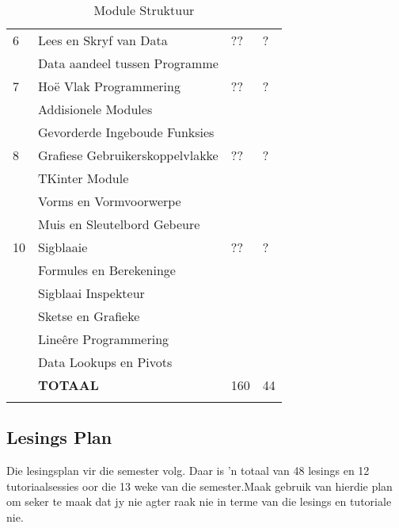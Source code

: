 \begin{longtable}{|p{2.0cm}|p{7.6cm}|p{2.0cm}|p{1.8cm}|}
             \hline
             6  & Lees en Skryf van Data                       & ?? & ?  \\
                & \qquad Data aandeel tussen Programme         &    &    \\
             \hline
             7  & Ho\"{e} Vlak Programmering                   & ?? & ?  \\
                & \qquad Addisionele Modules                   &    &    \\
                & \qquad Gevorderde Ingeboude Funksies         &    &    \\
             \hline
             8  & Grafiese Gebruikerskoppelvlakke              & ?? & ?  \\
                & \qquad TKinter Module                        &    &    \\
                & \qquad Vorms en Vormvoorwerpe                &    &    \\
                & \qquad Muis en Sleutelbord Gebeure           &    &    \\
             \hline
             10 & Sigblaaie                                    & ?? & ?  \\
                & \qquad Formules en Berekeninge               &    &    \\
                & \qquad Sigblaai Inspekteur                   &    &    \\
                & \qquad Sketse en Grafieke                    &    &    \\
                & \qquad Line\^{e}re Programmering             &    &    \\
                & \qquad Data Lookups en Pivots                &    &    \\
             \hline
                & {\bf TOTAAL}                                 &160 & 44 \\
             \hline
            \caption[Module Struktuur]{Module Struktuur} \label{tab:study_comp}
        \end{longtable}

    \subsection{Lesings Plan}
        Die lesingsplan vir die semester volg. Daar is 'n totaal van 48
        lesings en 12 tutoriaalsessies oor die 13 weke van die semester.Maak
        gebruik van hierdie plan om seker te maak dat jy nie agter raak nie in
        terme van die lesings en tutoriale nie.

